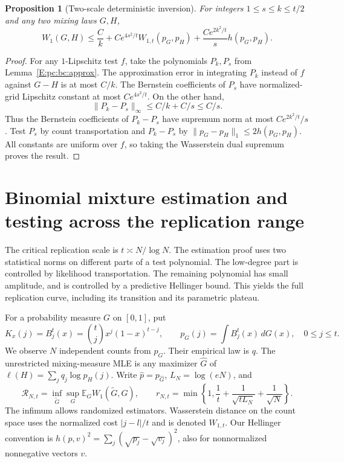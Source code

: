 \documentclass[11pt,a4paper]{article}
\newtheorem{proposition}[theorem]{Proposition}
\theoremstyle{definition}
\theoremstyle{remark}
\numberwithin{equation}{section}
\begin{document}
\begin{proposition}[Two-scale deterministic inversion]
\label{E:pc:bc:twoscale}
For integers $1\le s\le k\le t/2$ and any two mixing laws $G,H$,
\begin{equation}\label{E:pc:bc:twoscaleineq}
 W_1(G,H)\le \frac Ck
       +Ce^{4s^2/t}W_{1,t}(p_G,p_H)
       +\frac{Ce^{2k^2/t}}s h(p_G,p_H).
\end{equation}
\end{proposition}
\begin{proof}
For any $1$-Lipschitz test $f$, take the polynomials $P_k,P_s$ from
Lemma~\ref{E:pc:bc:approx}. The approximation error in integrating $P_k$
instead of $f$ against $G-H$ is at most $C/k$. The Bernstein coefficients
of $P_s$ have normalized-grid Lipschitz constant at most $Ce^{4s^2/t}$.
On the other hand,
\[
 \|P_k-P_s\|_\infty\le C/k+C/s\le C/s.
\]
Thus the Bernstein coefficients of $P_k-P_s$ have supremum norm at most
$Ce^{2k^2/t}/s$. Test $P_s$ by count transportation and $P_k-P_s$ by
$\|p_G-p_H\|_1\le2h(p_G,p_H)$. All constants are uniform over $f$,
so taking the Wasserstein dual supremum proves the result.
\end{proof}



\clearpage

\section{Binomial mixture estimation and testing across the replication range}
\label{E:p06:bm:sec}

The critical replication scale is $t\asymp N/\log N$.
The estimation proof uses two statistical norms on different
parts of a test polynomial. The low-degree part is controlled by
likelihood transportation. The remaining polynomial has small amplitude,
and is controlled by a predictive Hellinger bound. This yields the full
replication curve, including its transition and its parametric plateau.

For a probability measure $G$ on $[0,1]$, put
\[
 K_x(j)=B_j^t(x)=\binom tj x^j(1-x)^{t-j},\qquad
 p_G(j)=\int B_j^t(x)\,dG(x),\quad 0\le j\le t.
\]
We observe $N$ independent counts from $p_G$. Their empirical law is $q$.
The unrestricted mixing-measure MLE is any maximizer $\widehat G$ of
$\ell(H)=\sum_jq_j\log p_H(j)$. Write $\widehat p=p_{\widehat G}$,
$L_N=\log(eN)$, and
\[
 \mathcal R_{N,t}=\inf_{\widetilde G}\sup_G
       \mathbb E_G W_1(\widetilde G,G),\qquad
 r_{N,t}=\min\left\{1,\frac1t+
           \frac1{\sqrt{tL_N}}+\frac1{\sqrt N}\right\}.
\]
The infimum allows randomized estimators. Wasserstein distance on the
count space uses the normalized cost $|j-l|/t$ and is denoted $W_{1,t}$.
Our Hellinger convention is
$h(p,v)^2=\sum_j(\sqrt{p_j}-\sqrt{v_j})^2$, also for nonnormalized
nonnegative vectors $v$.
\end{document}

